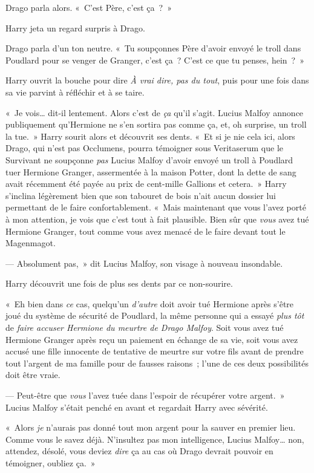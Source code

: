 Drago parla alors. «~C'est Père, c'est ça~?~»

Harry jeta un regard surpris à Drago.

Drago parla d'un ton neutre. «~Tu soupçonnes Père d'avoir envoyé le troll dans Poudlard pour se venger de Granger, c'est ça~? C'est ce que tu penses, hein~?~»

Harry ouvrit la bouche pour dire \emph{À vrai dire, pas du tout}, puis pour une fois dans sa vie parvint à réfléchir et à se taire.

«~Je vois… dit-il lentement. Alors c'est de \emph{ça} qu'il s'agit. Lucius Malfoy annonce publiquement qu'Hermione ne s'en sortira pas comme ça, et, oh surprise, un troll la tue.~» Harry sourit alors et découvrit ses dents. «~Et si je nie cela ici, alors Drago, qui n'est pas Occlumens, pourra témoigner sous Veritaserum que le Survivant ne soupçonne \emph{pas} Lucius Malfoy d'avoir envoyé un troll à Poudlard tuer Hermione Granger, assermentée à la maison Potter, dont la dette de sang avait récemment été payée au prix de cent-mille Gallions et cetera.~» Harry s'inclina légèrement bien que son tabouret de bois n'ait aucun dossier lui permettant de le faire confortablement. «~Mais maintenant que vous l'avez porté à mon attention, je vois que c'est tout à fait plausible. Bien sûr que \emph{vous} avez tué Hermione Granger, tout comme vous avez menacé de le faire devant tout le Magenmagot.

--- Absolument pas,~» dit Lucius Malfoy, son visage à nouveau insondable.

Harry découvrit une fois de plus ses dents par ce non-sourire.

«~Eh bien dans \emph{ce} cas, quelqu'un \emph{d'autre} doit avoir tué Hermione après s'être joué du système de sécurité de Poudlard, la même personne qui a essayé \emph{plus tôt} de \emph{faire accuser Hermione du meurtre de Drago Malfoy}. Soit vous avez tué Hermione Granger après reçu un paiement en échange de sa vie, soit vous avez accusé une fille innocente de tentative de meurtre sur votre fils avant de prendre tout l'argent de ma famille pour de fausses raisons~; l'une de ces deux possibilités doit être vraie.

--- Peut-être que \emph{vous} l'avez tuée dans l'espoir de récupérer votre argent.~» Lucius Malfoy s'était penché en avant et regardait Harry avec sévérité.

«~Alors \emph{je} n'aurais pas donné tout mon argent pour la sauver en premier lieu. Comme vous le savez déjà. N'insultez pas mon intelligence, Lucius Malfoy… non, attendez, désolé, vous deviez \emph{dire} ça au cas où Drago devrait pouvoir en témoigner, oubliez ça.~»

